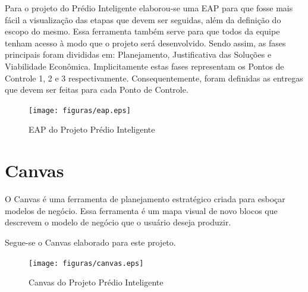 Para o projeto do Prédio Inteligente elaborou-se uma EAP para que fosse mais fácil a visualização das etapas que devem ser seguidas, além da definição do escopo do mesmo. Essa ferramenta também serve para que todos da equipe tenham acesso à modo que o projeto será desenvolvido. Sendo assim, as fases principais foram divididas em: Planejamento, Justificativa das Soluções e Viabilidade Econômica. Implicitamente estas fases representam os Pontos de Controle 1, 2 e 3 respectivamente. Consequentemente, foram definidas as entregas que devem ser feitas para cada Ponto de Controle.
 \begin{figure}[!h]
 	\centering
 	\texttt{[image: figuras/eap.eps]}
 	\caption{EAP do Projeto Prédio Inteligente}
 	\label{fig01}
 \end{figure}

\chapter{Canvas}
O Canvas é uma ferramenta de planejamento estratégico criada para esboçar modelos de negócio. Essa ferramenta é um mapa visual de novo blocos
que descrevem o modelo de negócio que o usuário deseja produzir.

Segue-se o Canvas elaborado para este projeto.

\begin{figure}[!h]
 \centering
 \texttt{[image: figuras/canvas.eps]}
 \caption{Canvas do Projeto Prédio Inteligente}
 \label{fig031}
\end{figure}
